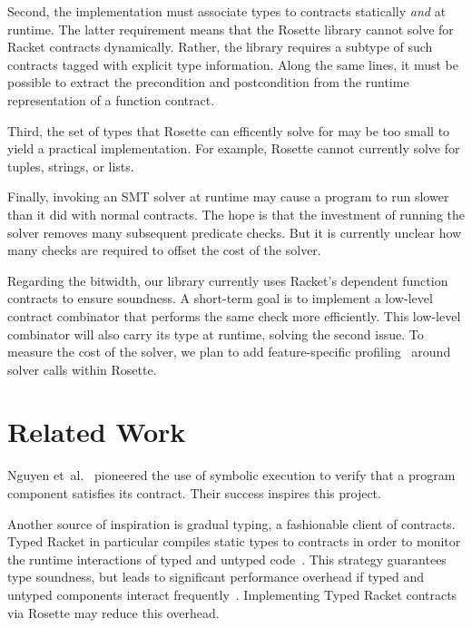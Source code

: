 \documentclass[nocopyrightspace,preprint,9pt]{sigplanconf}
\begin{document}
Second, the implementation must associate types to contracts statically \emph{and} at runtime.
The latter requirement means that the Rosette library cannot solve for Racket contracts dynamically.
Rather, the library requires a subtype of such contracts tagged with explicit type information. %
Along the same lines, it must be possible to extract the precondition and postcondition from the runtime representation of a function contract.

Third, the set of types that Rosette can efficently solve for may be too small to yield a practical implementation.
For example, Rosette cannot currently solve for tuples, strings, or lists.

Finally, invoking an SMT solver at runtime may cause a program to run slower than it did with normal contracts.
The hope is that the investment of running the solver removes many subsequent predicate checks.
But it is currently unclear how many checks are required to offset the cost of the solver.

Regarding the bitwidth, our library currently uses Racket's dependent function contracts to ensure soundness.
A short-term goal is to implement a low-level contract combinator that performs the same check more efficiently.
This low-level combinator will also carry its type at runtime, solving the second issue.
To measure the cost of the solver, we plan to add feature-specific profiling~\cite{saf-cc-2015} around solver calls within Rosette.


\section{Related Work}

Nguyen et~al.~\cite{ntv-icfp-2014} pioneered the use of symbolic execution to verify that a program component satisfies its contract.
Their success inspires this project.

Another source of inspiration is gradual typing, a fashionable client of contracts.
Typed Racket in particular compiles static types to contracts in order to monitor the runtime interactions of typed and untyped code~\cite{tf-popl-2008}.
This strategy guarantees type soundness, but leads to significant performance overhead if typed and untyped components interact frequently~\cite{tfgnfv-popl-2016}.
Implementing Typed Racket contracts via Rosette may reduce this overhead.
\end{document}
